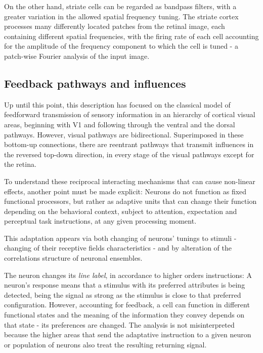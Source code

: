 On the other hand, striate cells can be regarded as bandpass filters, with a greater variation in the allowed spatial frequency tuning. 
The striate cortex processes many differently located patches from the retinal image, each containing different spatial frequencies, with the firing rate of each cell accounting for the amplitude of the frequency component to which the cell is tuned - a patch-wise Fourier analysis of the input image.


\vspace{-0.2cm}

\subsection{Feedback pathways and influences}

Up until this point, this description has focused on the classical model of feedforward transmission of sensory information in an hierarchy of cortical visual areas, beginning with V1 and following through the ventral and the dorsal pathways.
However, visual pathways are bidirectional. Superimposed in these bottom-up connections, there are reentrant pathways that transmit influences in the reversed top-down direction, in every stage of the visual pathways except for the retina.%

To understand these reciprocal interacting mechanisms that can cause non-linear effects, another point must be made explicit: Neurons do not function as fixed functional processors, but rather as adaptive units that can change their function depending on the behavioral context, subject to attention, expectation and perceptual task instructions, at any given processing moment.

This adaptation appears via both changing of neurons' tunings to stimuli - changing of their receptive fields characteristics - and by alteration of the correlations structure of neuronal ensembles.

The neuron changes its \textit{line label}, in accordance to higher orders instructions: A neuron's response means that a stimulus with its preferred attributes is being detected, being the signal as strong as the stimulus is close to that preferred configuration. However, accounting for feedback, a cell can function in different functional states and the meaning of the information they convey depends on that state - its preferences are changed. The analysis is not misinterpreted because the higher areas that send the adaptative instruction to a given neuron or population of neurons also treat the resulting returning signal.

